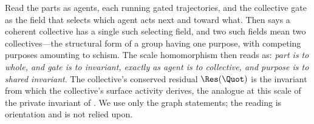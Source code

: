 \begin{remark}
\label{rem:purpose}
Read the parts as agents, each running gated trajectories, and the collective
gate as the field that selects which agent acts next and toward what. Then
 says a coherent collective has a single such selecting
field, and two such fields mean two collectives---the structural form of a group
having one purpose, with competing purposes amounting to schism. The scale
homomorphism  then reads as: \emph{part is to whole, and
gate is to invariant, exactly as agent is to collective, and purpose is to shared
invariant}. The collective's conserved residual $\Res(\Quot)$ is the invariant
from which the collective's surface activity derives, the analogue at this scale
of the private invariant of . We use only the graph
statements; the reading is orientation and is not relied upon.
\end{remark}
